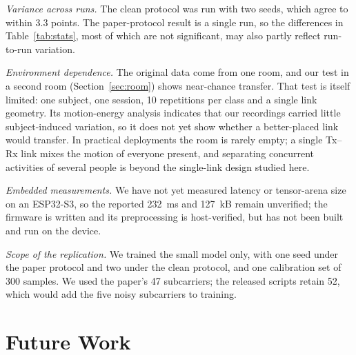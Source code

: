 \documentclass[journal]{IEEEtran}
\begin{document}
\emph{Variance across runs.} The clean protocol was run with two seeds, which agree
to within 3.3 points. The paper-protocol result is a single run, so the differences in
Table~\ref{tab:stats}, most of which are not significant, may also partly reflect
run-to-run variation.

\emph{Environment dependence.} The original data come from one room, and our test in
a second room (Section~\ref{sec:room}) shows near-chance transfer. That test is itself
limited: one subject, one session, 10 repetitions per class and a single link
geometry. Its motion-energy analysis indicates that our recordings carried little
subject-induced variation, so it does not yet show whether a better-placed link would
transfer. In practical deployments the room is rarely empty; a single Tx--Rx link
mixes the motion of everyone present, and separating concurrent activities of
several people is beyond the single-link design studied here.

\emph{Embedded measurements.} We have not yet measured latency or tensor-arena size
on an ESP32-S3, so the reported 232~ms and 127~kB remain unverified; the firmware is
written and its preprocessing is host-verified, but has not been built and run on
the device.

\emph{Scope of the replication.} We trained the small model only, with one seed under
the paper protocol and two under the clean protocol, and one calibration set of 300
samples. We used the paper's 47 subcarriers; the released
scripts retain 52, which would add the five noisy subcarriers to training.

\section{Future Work}
\end{document}
